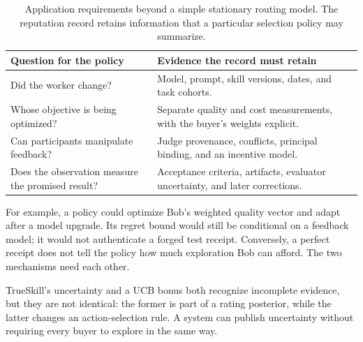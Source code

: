 \documentclass[11pt,a4paper]{article}
\theoremstyle{definition}
\begin{document}
\begin{table}[H]
\centering\small
\caption{Application requirements beyond a simple stationary routing model. The reputation record retains information that a particular selection policy may summarize.}
\label{tab:stp-not-bandit}
\begin{tabularx}{\textwidth}{@{}>{\raggedright\arraybackslash}X >{\raggedright\arraybackslash}X@{}}
\toprule
\textbf{Question for the policy} & \textbf{Evidence the record must retain} \\
\midrule
Did the worker change? & Model, prompt, skill versions, dates, and task cohorts. \\
Whose objective is being optimized? & Separate quality and cost measurements, with the buyer's weights explicit. \\
Can participants manipulate feedback? & Judge provenance, conflicts, principal binding, and an incentive model. \\
Does the observation measure the promised result? & Acceptance criteria, artifacts, evaluator uncertainty, and later corrections. \\
\bottomrule
\end{tabularx}
\end{table}

For example, a policy could optimize Bob's weighted quality vector and adapt after a model upgrade. Its regret bound would still be conditional on a feedback model; it would not authenticate a forged test receipt. Conversely, a perfect receipt does not tell the policy how much exploration Bob can afford. The two mechanisms need each other.

TrueSkill's uncertainty and a UCB bonus both recognize incomplete evidence, but they are not identical: the former is part of a rating posterior, while the latter changes an action-selection rule. A system can publish uncertainty without requiring every buyer to explore in the same way.


\pdexercisepointer{\ref{ex:stp-four-broken-assumptions}}{\ref{ex:stp-arms-race}}{\pageref{ex:stp-four-broken-assumptions}}

\end{document}
